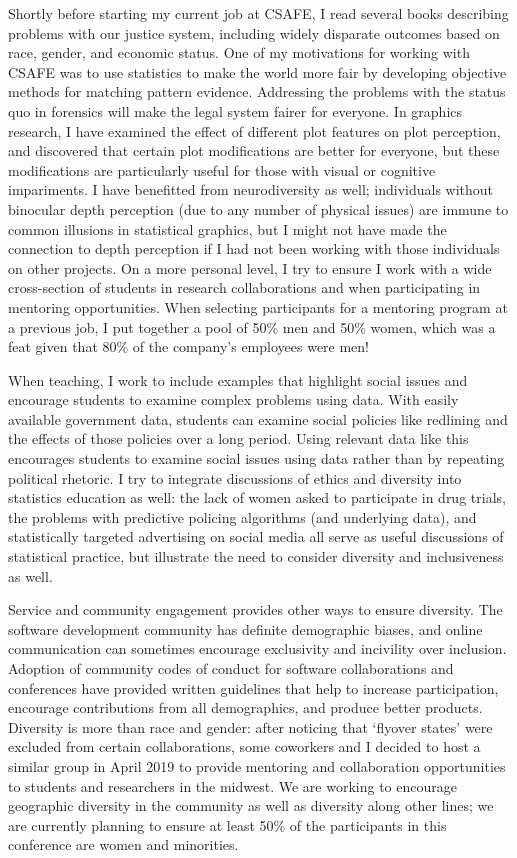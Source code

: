 \documentclass[12pt, letterpaper, sans]{moderncv}
\begin{document}
Shortly before starting my current job at CSAFE, I read several books describing problems with our justice system, including widely disparate outcomes based on race, gender, and economic status. One of my motivations for working with CSAFE was to use statistics to make the world more fair by developing objective methods for matching pattern evidence. Addressing the problems with the status quo in forensics will make the legal system fairer for everyone. In graphics research, I have examined the effect of different plot features on plot perception, and discovered that  certain plot modifications are better for everyone, but these modifications are particularly useful for those with visual or cognitive impariments. I have benefitted from neurodiversity as well; individuals without binocular depth perception (due to any number of physical issues) are immune to common illusions in statistical graphics, but I might not have made the connection to depth perception if I had not been working with those individuals on other projects. On a more personal level, I try to ensure I work with a wide cross-section of students in research collaborations and when participating in mentoring opportunities. When selecting participants for a mentoring program at a previous job, I put together a pool of 50\% men and 50\% women, which was a feat given that 80\% of the company's employees were men!

When teaching, I work to include examples that highlight social issues and encourage students to examine complex problems using data. With easily available government data, students can examine social policies like redlining and the effects of those policies over a long period. Using relevant data like this encourages students to examine social issues using data rather than by repeating political rhetoric.  I try to integrate discussions of ethics and diversity into statistics education as well: the lack of women asked to participate in drug trials, the problems with predictive policing algorithms (and underlying data), and statistically targeted advertising on social media all serve as useful discussions of statistical practice, but illustrate the need to consider diversity and inclusiveness as well. 

Service and community engagement provides other ways to ensure diversity. The software development community has definite demographic biases, and online communication can sometimes encourage exclusivity and incivility over inclusion. Adoption of community codes of conduct for software collaborations and conferences have provided written guidelines that help to increase participation, encourage contributions from all demographics, and produce better products. Diversity is more than race and gender: after noticing that `flyover states' were excluded from certain collaborations, some coworkers and I decided to host a similar group in April 2019 to provide mentoring and collaboration opportunities to students and researchers in the midwest. We are working to encourage geographic diversity in the community as well as diversity along other lines; we are currently planning to ensure at least 50\% of the participants in this conference are women and minorities. 
\end{document}
